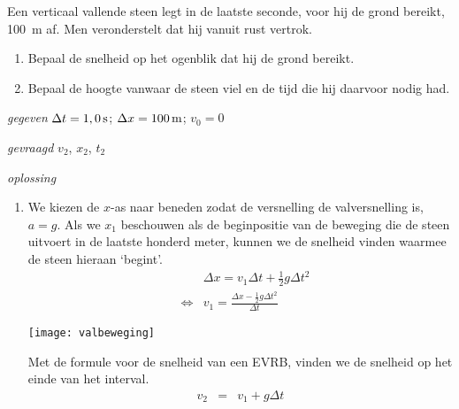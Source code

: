 

\item{}Een verticaal vallende steen legt in de laatste seconde, voor hij de grond bereikt, \SI{100}{m} af. Men veronderstelt dat hij vanuit rust vertrok.
\begin{enumerate}
\item Bepaal de snelheid op het ogenblik dat hij de grond bereikt.
\item Bepaal de hoogte vanwaar de steen viel en de tijd die hij daarvoor nodig had.
\end{enumerate}

\begin{oplossing}
\item[\textit{gegeven}]$\Delta t=1,0\rm\,s$; $\Delta x=100\rm\,m$; $v_0=0$
\item[\textit{gevraagd}]$v_2$, $x_2$, $t_2$
\item[\textit{oplossing}]
\begin{enumerate}
\item 
\begin{minipage}[t]{.7\textwidth}
We kiezen de $x$-as naar beneden zodat de versnelling de valversnelling is, $a=g$. Als we $x_1$ beschouwen als de beginpositie van de beweging die de steen uitvoert in de laatste honderd meter, kunnen we de snelheid vinden waarmee de steen hieraan `begint'.
\begin{eqnarray*}
&&\Delta x=v_1\Delta t+\frac{1}{2}g\Delta t^2\\
&\Leftrightarrow&v_1=\frac{\Delta x-\frac{1}{2}g\Delta t^2}{\Delta t}
\end{eqnarray*}
\end{minipage}
\begin{minipage}[t][4.5cm][b]{.3\textwidth}
\texttt{[image: valbeweging]}
\end{minipage}
\newline
\newline
\newline
Met de formule voor de snelheid van een EVRB, vinden we de snelheid op het einde van het interval.
\begin{eqnarray*}
v_2&=&v_1+g\Delta t\\

\end{eqnarray*}
\end{enumerate}
\end{oplossing}
